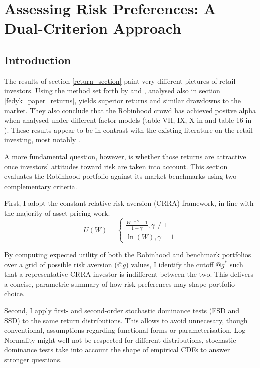 \section{Assessing Risk Preferences: A Dual-Criterion Approach}
\subsection{Introduction}
The results of section \ref{return_section} paint very different pictures of retail investors. 
Using the method set forth by \cite{Welch2022} and \cite{Fedyk2024}, analysed also in section \ref{fedyk_paper_returns}, yields superior returns and similar drawdowns to the market.
They also conclude that the Robinhood crowd has achieved positve alpha when analysed under different factor models (table VII, IX, X in \cite{Welch2022} and table 16 in \cite{Fedyk2024}). 
These results appear to be in contrast with the existing literature on the retail investing, most notably \cite{BarberOdean2000}.

A more fundamental question, however, is whether those returns are attractive once investors' attitudes toward risk are taken into account.
This section evaluates the Robinhood portfolio against its market benchmarks using two complementary criteria.

First, I adopt the constant-relative-risk-aversion (CRRA) framework, in line with the majority of asset pricing work.
\begin{equation}
    U(W) = 
    \begin{cases}
    \frac{W^{1-\gamma}-1}{1-\gamma}, \gamma\neq 1\\
    \ln(W), \gamma = 1
    \end{cases}
\end{equation}

By computing expected utility of both the Robinhood and benchmark portfolios over a grid of possible risk aversion ($@g$) values,
I identify the cutoff $@g^*$ such that a representative CRRA investor is indifferent between the two.
This delivers a concise, parametric summary of how risk preferences may shape portfolio choice.

Second, I apply first- and second-order stochastic dominance tests (FSD and SSD) to the same return distributions.
This allows to avoid unnecesary, though conventional, assumptions regarding functional forms or parameterisation.
Log-Normality might well not be respected for different distributions, stochastic dominance tests take into account the shape of empirical CDFs to answer stronger questions. 

